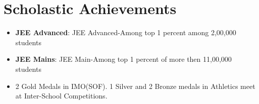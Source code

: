 \documentclass[a4paper,10pt]{extarticle} %
\begin{document}

\vspace{-0.2cm}
\section{\textcolor{primary}{Scholastic Achievements}}

\begin{itemize}[leftmargin=0.55cm, rightmargin=0.2cm, label={\Large\textbullet}]

\item\textbf{JEE Advanced}: {JEE Advanced-Among top 1 percent among 2,00,000 students}
\item\textbf{JEE Mains}: {JEE Main-Among top 1 percent of more then 11,00,000 students}
\item\textbf{}2 Gold Medals in IMO(SOF). 1 Silver and 2 Bronze medals in Athletics meet at Inter-School Competitions. 
\end{itemize}
\vspace{0.4cm}
\end{document}
